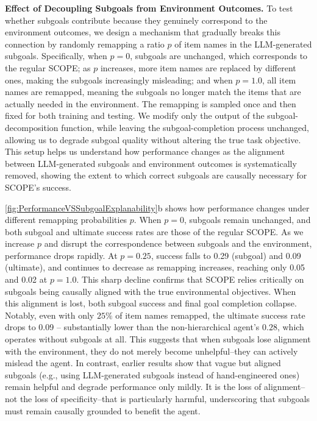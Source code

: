 \textbf{Effect of Decoupling Subgoals from Environment Outcomes.} To test whether subgoals contribute because they genuinely correspond to the environment outcomes, we design a mechanism that gradually breaks this connection by randomly remapping a ratio $p$ of item names in the LLM-generated subgoals. Specifically, when $p = 0$, subgoals are unchanged, which corresponds to the regular SCOPE; as $p$ increases, more item names are replaced by different ones, making the subgoals increasingly misleading; and when $p = 1.0$, all item names are remapped, meaning the subgoals no longer match the items that are actually needed in the environment. The remapping is sampled once and then fixed for both training and testing. We modify only the output of the subgoal-decomposition function, while leaving the subgoal-completion process unchanged, allowing us to degrade subgoal quality without altering the true task objective. This setup helps us understand how performance changes as the alignment between LLM-generated subgoals and environment outcomes is systematically removed, showing the extent to which correct subgoals are causally necessary for SCOPE's success. 


\cref{fig:PerformanceVSSubgoalExplanability}b shows how performance changes under different remapping probabilities $p$. When $p=0$, subgoals remain unchanged, and both subgoal and ultimate success rates are those of the regular SCOPE. As we increase $p$ and disrupt the correspondence between subgoals and the environment, performance drops rapidly. At $p=0.25$, success falls to 0.29 (subgoal) and 0.09 (ultimate), and continues to decrease as remapping increases, reaching only 0.05 and 0.02 at $p=1.0$. This sharp decline confirms that SCOPE relies critically on subgoals being causally aligned with the true environmental objectives. When this alignment is lost, both subgoal success and final goal completion collapse. Notably, even with only $25\%$ of item names remapped, the ultimate success rate drops to 0.09 -- substantially lower than the non-hierarchical agent's $0.28$, which operates without subgoals at all. This suggests that when subgoals lose alignment with the environment, they do not merely become unhelpful--they can actively mislead the agent. In contrast, earlier results show that vague but aligned subgoals (e.g., using LLM-generated subgoals instead of hand-engineered ones) remain helpful and degrade performance only mildly. It is the loss of alignment--not the loss of specificity--that is particularly harmful, underscoring that subgoals must remain causally grounded to benefit the agent. 















